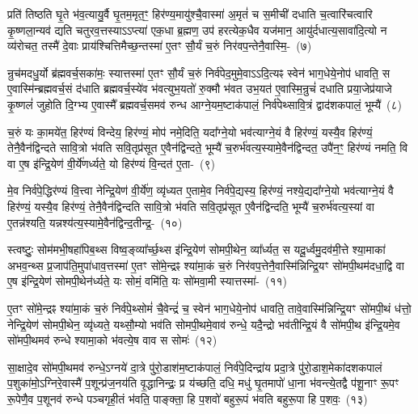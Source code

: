 प्रति॑ तिष्ठति घृ॒ते भ॑व॒त्यायु॒र्वै घृ॒तम॒मृत॒ꣳ॒ हिर॑ण्य॒मायु॑श्चै॒वा\-स्मा॑ अ॒मृतं॑ च स॒मीची॑ दधाति च॒त्वारि॑चत्वारि कृ॒ष्णला॒न्यव॑ द्यति चतुरव॒त्तस्या\-ऽऽ\-प्त्या॑ एक॒धा ब्र॒ह्मण॒ उप॑ हरत्येक॒धैव यज॑मान॒ आयु॑र्दधात्य॒सावा॑दि॒त्यो न व्य॑रोचत॒ तस्मै॑ दे॒वाः प्राय॑श्चित्ति\-मैच्छ॒न्तस्मा॑ ए॒तꣳ सौ॒र्यं च॒रुं निर॑वप॒न्तेनै॒वास्मि॒-~(७)\ip

न्रुच॑मदधु॒र्यो ब्र॑ह्मवर्च॒सका॑मः॒ स्यात्तस्मा॑ ए॒तꣳ सौ॒र्यं च॒रुं निर्व॑पेद॒मुमे॒वा\-ऽऽ\-दि॒त्यꣴ स्वेन॑ भाग॒\-धेये॒नोप॑ धावति॒ स ए॒वास्मि॑न्ब्रह्मवर्च॒सं द॑धाति ब्रह्मवर्च॒स्ये॑व भ॑वत्युभ॒यतो॑ रु॒क्मौ भ॑वत उभ॒यत॑ ए॒वास्मि॒न्रुचं॑ दधाति प्रया॒जेप्र॑याजे कृ॒ष्णलं॑ जुहोति दि॒ग्भ्य ए॒वास्मै᳚ ब्रह्मवर्च॒समव॑ रुन्ध आग्ने॒यम॒ष्टा\-क॑पालं॒ निर्व॑पेथ्सावि॒त्रं द्वाद॑श\-कपालं॒ भूम्यै॑~(८)\ip

च॒रुं यः का॒मये॑त॒ हिर॑ण्यं विन्देय॒ हिर॑ण्यं॒ मोप॑ नमे॒दिति॒ यदा᳚ग्ने॒यो भव॑त्याग्ने॒यं वै हिर॑ण्यं॒ यस्यै॒व हिर॑ण्यं॒ तेनै॒वैन॑द्विन्दते सावि॒त्रो भ॑वति सवि॒तृप्र॑सूत ए॒वैन॑द्विन्दते॒ भूम्यै॑ च॒रुर्भ॑वत्य॒स्यामे॒वैन॑द्विन्दत॒ उपै॑न॒ꣳ॒ हिर॑ण्यं नमति॒ वि वा ए॒ष इ॑न्द्रि॒येण॑ वी॒र्ये॑णर्ध्यते॒ यो हिर॑ण्यं वि॒न्दत॑ ए॒ता-~(९)\ip

मे॒व निर्व॑पे॒द्धिर॑ण्यं वि॒त्त्वा नेन्द्रि॒येण॑ वी॒र्ये॑ण॒ व्यृ॑ध्यत ए॒तामे॒व निर्व॑पे॒द्यस्य॒ हिर॑ण्यं॒ नश्ये॒द्यदा᳚ग्ने॒यो भव॑त्याग्ने॒यं वै हिर॑ण्यं॒ यस्यै॒व हिर॑ण्यं॒ तेनै॒वैन॑द्विन्दति सावि॒त्रो भ॑वति सवि॒तृप्र॑सूत ए॒वैन॑द्विन्दति॒ भूम्यै॑ च॒रुर्भ॑वत्य॒स्यां वा ए॒तन्न॑श्यति॒ यन्नश्य॑त्य॒स्यामे॒वैन॑द्विन्द॒ती\-न्द्र॒-~(१०)\ip

स्त्वष्टुः॒ सोम॑मभी॒षहा॑पिब॒थ्स विष्व॒ङ्व्या᳚र्च्छ॒थ्स इ॑न्द्रि॒येण॑ सोमपी॒थेन॒ व्या᳚र्ध्यत॒ स यदू॒र्ध्वमु॒दव॑मी॒त्ते श्या॒माका॑ अभव॒न्थ्स प्र॒जा\-प॑ति॒मुपा॑धाव॒त्तस्मा॑ ए॒तꣳ सो॑मे॒न्द्रꣴ श्या॑मा॒कं च॒रुं निर॑वप॒त्तेनै॒वास्मि॑न्निन्द्रि॒यꣳ सो॑मपी॒थम॑दधा॒द्वि वा ए॒ष इ॑न्द्रि॒येण॑ सोमपी॒थेन॑र्ध्यते॒ यः सोमं॒ वमि॑ति॒ यः सो॑मवा॒मी स्यात्तस्मा॑-~(११)\ip

ए॒तꣳ सो॑मे॒न्द्रꣴ श्या॑मा॒कं च॒रुं निर्व॑पे॒थ्सोमं॑ चै॒वेन्द्रं॑ च॒ स्वेन॑ भाग॒\-धेये॒नोप॑ धावति॒ तावे॒वास्मि॑न्निन्द्रि॒यꣳ सो॑मपी॒थं ध॑त्तो॒ नेन्द्रि॒येण॑ सोमपी॒थेन॒ व्यृ॑ध्यते॒ यथ्सौ॒म्यो भव॑ति सोमपी॒थमे॒वाव॑ रुन्धे॒ यदै॒न्द्रो भव॑तीन्द्रि॒यं वै सो॑मपी॒थ इ॑न्द्रि॒यमे॒व सो॑मपी॒थमव॑ रुन्धे श्यामा॒को भ॑वत्ये॒ष वाव स सोमः॑~(१२)\ip

सा॒क्षादे॒व सो॑मपी॒थमव॑ रुन्धे॒\-ऽग्नये॑ दा॒त्रे पु॑रो॒डाश॑म॒ष्टा\-क॑पालं॒ निर्व॑पे॒दिन्द्रा॑य प्रदा॒त्रे पु॑रो॒डाश॒मेका॑\-दश\-कपालं प॒शुका॑मो॒\-ऽग्निरे॒वास्मै॑ प॒शून्प्र॑ज॒नय॑ति वृ॒द्धानिन्द्रः॒ प्र य॑च्छति॒ दधि॒ मधु॑ घृ॒तमापो॑ धा॒ना भ॑वन्त्ये॒तद्वै प॑शू॒नाꣳ रू॒पꣳ रू॒पेणै॒व प॒शूनव॑ रुन्धे पञ्चगृही॒तं भ॑वति॒ पाङ्क्ता॒ हि प॒शवो॑ बहुरू॒पं भ॑वति बहुरू॒पा हि प॒शवः॒~(१३)\ip


